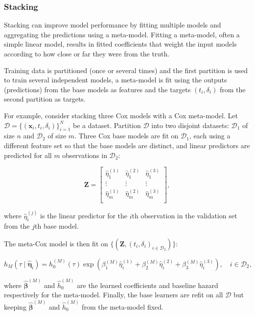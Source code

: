 \documentclass[
  letterpaper,
  krantz2]{style/krantz}
\begin{document}
\subsubsection{Stacking}\label{stacking}

Stacking can improve model performance by fitting multiple models and
aggregating the predictions using a meta-model.  Fitting
a meta-model, often a simple linear model, results in fitted
coefficients that weight the input models according to how close or far
they were from the truth.

Training data is partitioned (once or several times) and the first
partition is used to train several independent models, a meta-model is
fit using the outputs (predictions) from the base models as features and
the targets \((t_i,\delta_i)\) from the second partition as targets.

For example, consider stacking three Cox models with a Cox meta-model.
 Let
\(\mathcal{D}= \{(\mathbf{x}_i, t_i, \delta_i)\}_{i=1}^N\) be a dataset.
Partition \(\mathcal{D}\) into two disjoint datasets: \(\mathcal{D}_1\)
of size \(n\) and \(\mathcal{D}_2\) of size \(m\). Three Cox base models
are fit on \(\mathcal{D}_1\), each using a different feature set so that
the base models are distinct, and linear predictors are predicted for
all \(m\) observations in \(\mathcal{D}_2\):

\[
\mathbf{Z} = 
\begin{bmatrix}
\hat{\eta}^{(1)}_{1} & \hat{\eta}^{(2)}_{1} & \hat{\eta}^{(3)}_{1} \\
\vdots & \vdots & \vdots \\
\hat{\eta}^{(1)}_{m} & \hat{\eta}^{(2)}_{m} & \hat{\eta}^{(3)}_{m} \\
\end{bmatrix},
\]

where \(\hat{\eta}^{(j)}_{i}\) is the linear predictor for the \(i\)th
observation in the validation set from the \(j\)th base model.

The meta-Cox model is then fit on
\(\{(\mathbf{Z}, (t_i, \delta_i)_{i \in \mathcal{D}_2})\}\):

\[
h_M(\tau \mid \hat{\boldsymbol{\eta}}_i) = h^{(M)}_{0}(\tau)\exp(\beta^{(M)}_1\hat{\eta}^{(1)}_{i} + \beta^{(M)}_2\hat{\eta}^{(2)}_{i} + \beta^{(M)}_3\hat{\eta}^{(3)}_{i}), \quad i \in \mathcal{D}_2,
\]

where \(\hat{\boldsymbol{\beta}}^{(M)}\) and \(\hat{h}^{(M)}_0\) are the
learned coefficients and baseline hazard respectively for the
meta-model. Finally, the base learners are refit on all \(\mathcal{D}\)
but keeping \(\hat{\boldsymbol{\beta}}^{(M)}\) and \(\hat{h}^{(M)}_0\)
from the meta-model fixed.
\end{document}
